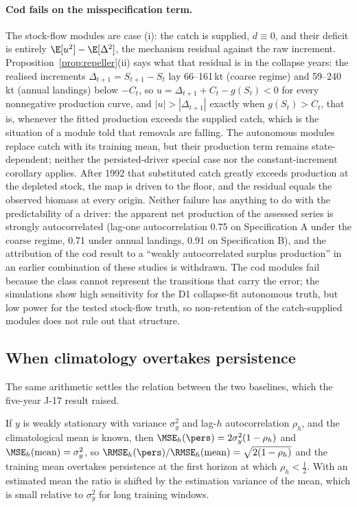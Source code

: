 \paragraph{Cod fails on the misspecification term.} The stock-flow modules are case (i): the catch is supplied, $d\equiv0$, and their deficit is entirely $\E[u^2]-\E[\Delta^2]$, the mechanism residual against the raw increment. Proposition~\ref{prop:repeller}(ii) says what that residual is in the collapse years: the realised increments $\Delta_{t+1}=S_{t+1}-S_t$ lay 66--161\,kt (coarse regime) and 59--240\,kt (annual landings) below $-C_t$, so $u=\Delta_{t+1}+C_t-g(S_t)<0$ for every nonnegative production curve, and $|u|>|\Delta_{t+1}|$ exactly when $g(S_t)>C_t$, that is, whenever the fitted production exceeds the supplied catch, which is the situation of a module told that removals are falling. The autonomous modules replace catch with its training mean, but their production term remains state-dependent; neither the persisted-driver special case nor the constant-increment corollary applies. After 1992 that substituted catch greatly exceeds production at the depleted stock, the map is driven to the floor, and the residual equals the observed biomass at every origin. Neither failure has anything to do with the predictability of a driver: the apparent net production of the assessed series is strongly autocorrelated (lag-one autocorrelation 0.75 on Specification A under the coarse regime, 0.71 under annual landings, 0.91 on Specification B), and the attribution of the cod result to a ``weakly autocorrelated surplus production'' in an earlier combination of these studies is withdrawn. The cod modules fail because the class cannot represent the transitions that carry the error; the simulations show high sensitivity for the D1 collapse-fit autonomous truth, but low power for the tested stock-flow truth, so non-retention of the catch-supplied modules does not rule out that structure.

\subsection{When climatology overtakes persistence}\label{sec:crossover}

The same arithmetic settles the relation between the two baselines, which the five-year J-17 result raised.

\begin{remark}\label{rem:crossover}
If $y$ is weakly stationary with variance $\sigma_y^2$ and lag-$h$ autocorrelation $\rho_h$, and the climatological mean is known, then $\MSE_h(\pers)=2\sigma_y^2(1-\rho_h)$ and $\MSE_h(\mathrm{mean})=\sigma_y^2$, so $\RMSE_h(\pers)/\RMSE_h(\mathrm{mean})=\sqrt{2(1-\rho_h)}$ and the training mean overtakes persistence at the first horizon at which $\rho_h<\tfrac12$. With an estimated mean the ratio is shifted by the estimation variance of the mean, which is small relative to $\sigma_y^2$ for long training windows.
\end{remark}

